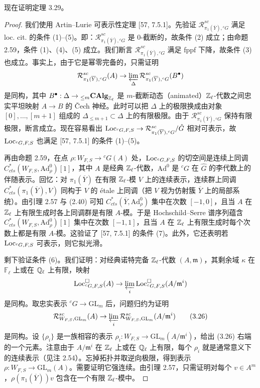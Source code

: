 现在证明定理 3.29。
\begin{proof}
我们使用 Artin–Lurie 可表示性定理 [57, 7.5.1]。先验证 $\mathcal R^{sc}_{\pi_1(\overline Y),{}^{c}G}$ 满足 loc. cit. 的条件 (1)–(5)。即：$\mathcal R^{sc}_{\pi_1(\overline Y),{}^{c}G}$ 是 $0$-截断的，故条件 (2) 成立；由命题 2.59，条件 (1)、(4)、(5) 成立。我们断言 $\mathcal R^{sc}_{\pi_1(\overline Y),{}^{c}G}$ 满足 fppf 下降，故条件 (3) 也成立。事实上，由于它是幂零完备的，只需证明
\[
\mathcal R^{sc}_{\pi_1(\overline Y),{}^{c}G}(A)\to\varprojlim_{\Delta}\mathcal R^{sc}_{\pi_1(\overline Y),{}^{c}G}(B^{\bullet})
\]
是同构，其中 $B^{\bullet}:\Delta\to{}_{\le m}\mathbf{CAlg}_{\mathbb{Z}_{\ell}}$ 是 $m$-截断动态（animated）$\mathbb{Z}_{\ell}$-代数之间忠实平坦映射 $A\to B$ 的 Čech 神经。此时可以把 $\Delta$ 上的极限换成由对象
$[0],\dots,[m+1]$ 组成的 $\Delta_{\le m+1}\subset\Delta$ 上的有限极限。由于 $\mathcal R^{sc}_{\pi_1(\overline Y),{}^{c}G}$ 保持有限极限，断言成立。现在容易看出 $\operatorname{Loc}_{{}^{c}G,F,S}\to\mathcal R^{sc}_{\pi_1(\overline Y),{}^{c}G}/\hat G$ 相对可表示，故 $\operatorname{Loc}_{{}^{c}G,F,S}$ 也满足 [57, 7.5.1] 的条件 (1)–(5)。

{\sloppy
再由命题 2.59，在点 $\rho:W_{F,S}\to{}^cG(A)$ 处，$\operatorname{Loc}_{{}^{c}G,F,S}$ 的切空间是连续上同调 $C^{*}_{cts}(W_{F,S},\mathrm{Ad}^{0}_{\rho})[1]$，其中 $A$ 是经典 $\mathbb{Z}_{\ell}$-代数，$\mathrm{Ad}^{0}$ 是 ${}^cG$ 在 $\hat G$ 的李代数上的伴随表示。回忆：对 $\pi_1(\overline Y)$ 在有限 $\mathbb{Z}_{\ell}$-模 $V$ 上的连续表示，连续群上同调 $C^{*}_{cts}(\pi_1(\overline Y),V)$ 同构于 $V$ 的 étale 上同调（把 $V$ 视为仿射簇 $\overline Y$ 上的局部系统）。由引理 2.57 与 (2.40) 可知 $C^{*}_{cts}(\overline Y,\mathrm{Ad}^{0}_{\rho})$ 集中在次数 $[-1,0]$，且当 $A$ 在 $\mathbb{Z}_{\ell}$ 上有限生成时各上同调群是有限 $A$-模。于是 Hochschild–Serre 谱序列蕴含 $C^{*}_{cts}(W_{F,S},\mathrm{Ad}^{0}_{\rho})[1]$ 集中在次数 $[-1,1]$，且当 $A$ 在 $\mathbb{Z}_{\ell}$ 上有限生成时每个次数上都是有限 $A$-模。这验证了 [57, 7.5.1] 的条件 (7)。此外，它还表明若 $\operatorname{Loc}_{{}^{c}G,F,S}$ 可表示，则它拟光滑。\par}

剩下验证条件 (6)。我们证明：对经典诺特完备 $\mathbb{Z}_{\ell}$-代数 $(A,\mathfrak m)$，其剩余域 $\kappa$ 在 $\mathbb F_{\ell}$ 上或在 $\mathbb{Q}_{\ell}$ 上有限，映射
\[
\operatorname{Loc}^{\square}_{{}^{c}G,F,S}(A)\to\varprojlim_{i}\operatorname{Loc}^{\square}_{{}^{c}G,F,S}(A/\mathfrak m^{i})
\]
是同构。取忠实表示 ${}^cG\to\mathrm{GL}_m$ 后，问题归约为证明
\begin{equation}
\mathcal R^{sc}_{W_{F,S},\mathrm{GL}_m}(A)\to\varprojlim_{i}\mathcal R^{sc}_{W_{F,S},\mathrm{GL}_m}(A/\mathfrak m^{i}) \tag{3.26}
\end{equation}
是同构。设 $\{\rho_i\}$ 是一族相容的表示 $\rho_i:W_{F,S}\to\mathrm{GL}_m(A/\mathfrak m^{i})$，给出 (3.26) 右端的一个元素。注意由于 $A/\mathfrak m^{i}$ 在 $\mathbb{Z}_{\ell}$ 上或在 $\mathbb{Q}_{\ell}$ 上有限，每个 $\rho_i$ 就是通常意义下的连续表示（见注 2.54）。忘掉拓扑并取逆向极限，得到表示 $\rho:W_{F,S}\to\mathrm{GL}_m(A)$。需要证明它强连续。由引理 2.57，只需证明对每个 $v\in A^{m}$，$\rho(\pi_1(\overline Y))v$ 包含在一个有限 $\mathbb{Z}_{\ell}$-模中。


\end{proof}
